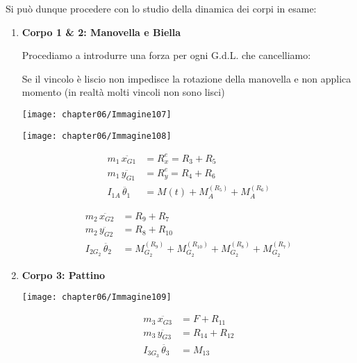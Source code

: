 Si può dunque procedere con lo studio della dinamica dei corpi in esame:
\begin{enumerate}
\item \textbf{Corpo 1 \& 2: Manovella e Biella}

Procediamo a introdurre una forza per ogni G.d.L. che cancelliamo: 

Se il vincolo è liscio non impedisce la rotazione della manovella e non applica momento (in realtà molti vincoli non sono lisci)

\begin{minipage}{.45\textwidth}
\centering
\texttt{[image: chapter06/Immagine107]}
\end{minipage}
\hfill
\begin{minipage}{.45\textwidth}
\centering
\texttt{[image: chapter06/Immagine108]}
\end{minipage}

\begin{minipage}{.5\textwidth}
\begin{align*}
	m_1\,\ddot{x_{G1}} &= R_x^e = R_3 + R_5\\
	m_1\,\ddot{y_{G1}} &= R_y^e = R_4 + R_6\\
	I_{1A}\,\ddot{\theta_1} &= M(t) + M_A^{(R_5)} + M_A^{(R_6)}
\end{align*}
\end{minipage}
\hfill
\begin{minipage}{.5\textwidth}
\begin{align*}
	m_2\,\ddot{x_{G2}} &= R_9 + R_7\\
	m_2\,\ddot{y_{G2}} &= R_8 + R_{10}\\
	I_{2G_2}\,\ddot{\theta_2} &= M_{G_2}^{(R_9)} + M_{G_2}^{(R_{10})} + M_{G_2}^{(R_8)} + M_{G_2}^{(R_7)}
\end{align*}
\end{minipage}



\item \textbf{Corpo 3: Pattino}

\begin{minipage}{.4\textwidth}
	\centering
	\texttt{[image: chapter06/Immagine109]}
\end{minipage}
\hfill
\begin{minipage}{.55\textwidth}
\begin{align*}
m_3\,\ddot{x_{G3}} &= F + R_{11}\\
m_3\,\ddot{y_{G3}} &= R_{14} + R_{12}\\
I_{3G_3}\,\ddot{\theta_3} &= M_{13}
\end{align*}
\end{minipage}
\end{enumerate}

